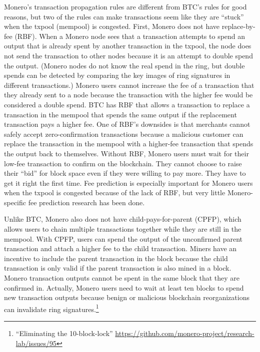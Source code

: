 \documentclass[usletter,11pt,english,openany]{article}
\begin{document}
Monero's transaction propagation rules are different from BTC's rules
for good reasons, but two of the rules can make transactions seem
like they are ``stuck'' when the txpool (mempool) is congested.
First, Monero does not have replace-by-fee (RBF). When a Monero node
sees that a transaction attempts to spend an output that is already
spent by another transaction in the txpool, the node does not send
the transaction to other nodes because it is an attempt to double
spend the output. (Monero nodes do not know the real spend in the
ring, but double spends can be detected by comparing the key images
of ring signatures in different transactions.) Monero users cannot
increase the fee of a transaction that they already sent to a node
because the transaction with the higher fee would be considered a
double spend. BTC has RBF that allows a transaction to replace a transaction
in the mempool that spends the same output if the replacement transaction
pays a higher fee. One of RBF's downsides is that merchants cannot
safely accept zero-confirmation transactions because a malicious customer
can replace the transaction in the mempool with a higher-fee transaction
that spends the output back to themselves. Without RBF, Monero users
must wait for their low-fee transaction to confirm on the blockchain.
They cannot choose to raise their ``bid'' for block space even if
they were willing to pay more. They have to get it right the first
time. Fee prediction is especially important for Monero users when
the txpool is congested because of the lack of RBF, but very little
Monero-specific fee prediction research has been done.

Unlike BTC, Monero also does not have child-pays-for-parent (CPFP),
which allows users to chain multiple transactions together while they
are still in the mempool. With CPFP, users can spend the output of
the unconfirmed parent transaction and attach a higher fee to the
child transaction. Miners have an incentive to include the parent
transaction in the block because the child transaction is only valid
if the parent transaction is also mined in a block. Monero transaction
outputs cannot be spent in the same block that they are confirmed
in. Actually, Monero users need to wait at least ten blocks to spend
new transaction outputs because benign or malicious blockchain reorganizations
can invalidate ring signatures.\footnote{``Eliminating the 10-block-lock'' \url{https://github.com/monero-project/research-lab/issues/95}}
\end{document}
